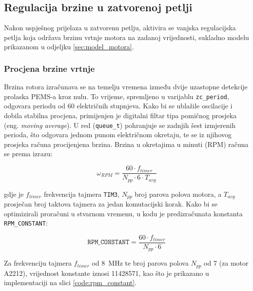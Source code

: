 \documentclass[diplomskirad, upload]{fer}
\begin{document}
\subsection{Regulacija brzine u zatvorenoj petlji}
\label{ssec:regulacija_brzine}

Nakon uspješnog prijelaza u zatvorenu petlju, aktivira se vanjska regulacijska
petlja koja održava brzinu vrtnje motora na zadanoj vrijednosti, sukladno
modelu prikazanom u odjeljku \ref{sec:model_motora}.

\subsubsection{Procjena brzine vrtnje}
\label{sssec:procjena_brzine}

Brzina rotora izračunava se na temelju vremena između dvije uzastopne detekcije
prolaska PEMS-a kroz nulu. To vrijeme, spremljeno u varijablu
\texttt{zc\_period}, odgovara periodu od 60 električnih stupnjeva. Kako bi se
ublažile oscilacije i dobila stabilna procjena, primijenjen je digitalni filtar
tipa pomičnog prosjeka (eng. \textit{moving average}). U red
(\texttt{queue\_t}) pohranjuje se zadnjih šest izmjerenih perioda, što odgovara
jednom punom električnom okretaju, te se iz njihovog prosjeka računa
procijenjena brzina. Brzina u okretajima u minuti (RPM) računa se prema izrazu:

\begin{equation}
	\omega_{RPM} = \frac{60 \cdot f_{timer}}{N_{pp} \cdot 6 \cdot T_{avg}}
\end{equation}

gdje je $f_{timer}$ frekvencija tajmera \texttt{TIM3}, $N_{pp}$ broj parova
polova motora, a $T_{avg}$ prosječan broj taktova tajmera za jedan komutacijski
korak. Kako bi se optimizirali proračuni u stvarnom vremenu, u kodu je
predizračunata konstanta \texttt{RPM\_CONSTANT}:

\begin{equation}
	\texttt{RPM\_CONSTANT} = \frac{60 \cdot f_{timer}}{N_{pp} \cdot 6}
\end{equation}

Za frekvenciju tajmera $f_{timer}$ od \SI{8}{\mega\hertz} te broj parova polova
$N_{pp}$ od 7 (za motor A2212), vrijednost konstante iznosi 11428571, kao što
je prikazano u implementaciji na slici \ref{code:rpm_constant}.
\end{document}
